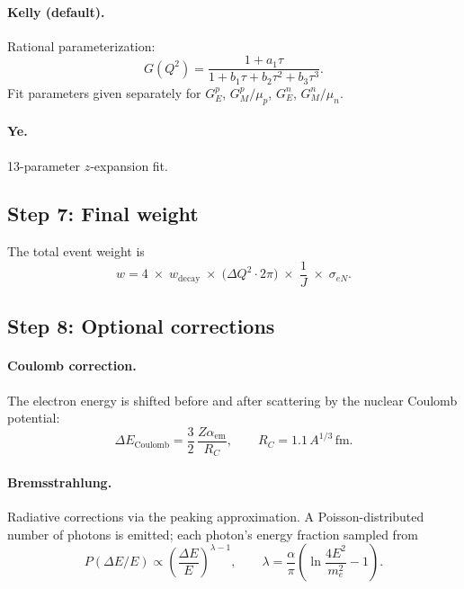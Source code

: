 \documentclass[11pt,a4paper]{article}
\newcommand{\unit}[1]{\,\mathrm{#1}}
\newcommand{\fm}{\unit{fm}}
\begin{document}
\paragraph{Kelly (default).}
Rational parameterization:
\begin{equation}
  G(Q^{2}) = \frac{1 + a_{1}\tau}{1 + b_{1}\tau + b_{2}\tau^{2} + b_{3}\tau^{3}}.
\end{equation}
Fit parameters given separately for $G_{E}^{p}$, $G_{M}^{p}/\mu_{p}$,
$G_{E}^{n}$, $G_{M}^{n}/\mu_{n}$.

\paragraph{Ye.}
13-parameter $z$-expansion fit.

\subsection{Step 7: Final weight}

The total event weight is
\begin{equation}
  w = 4 \;\times\; w_{\text{decay}} \;\times\;
      \bigl(\Delta Q^{2}\cdot 2\pi\bigr) \;\times\; \frac{1}{J}
      \;\times\; \sigma_{eN}.
\end{equation}

\subsection{Step 8: Optional corrections}

\paragraph{Coulomb correction.}
The electron energy is shifted before and after scattering by the nuclear
Coulomb potential:
\begin{equation}
  \Delta E_{\text{Coulomb}}
  = \frac{3}{2}\,\frac{Z\alpha_{\text{em}}}{R_{C}},
  \qquad
  R_{C} = 1.1\,A^{1/3}\fm.
\end{equation}

\paragraph{Bremsstrahlung.}
Radiative corrections via the peaking approximation.  A Poisson-distributed
number of photons is emitted; each photon's energy fraction sampled from
\begin{equation}
  P(\Delta E/E) \propto \left(\frac{\Delta E}{E}\right)^{\lambda - 1},
  \qquad
  \lambda = \frac{\alpha}{\pi}\left(\ln\frac{4E^{2}}{m_{e}^{2}} - 1\right).
\end{equation}
\end{document}

